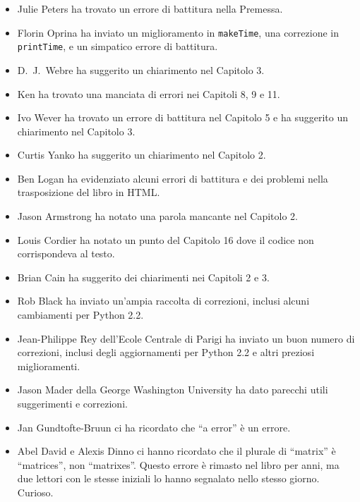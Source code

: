 \documentclass[10pt]{book}
\begin{document}
\begin{itemize}
\item Julie Peters ha trovato un errore di battitura nella Premessa.

\item Florin Oprina ha inviato un miglioramento in {\tt makeTime},
una correzione in {\tt printTime}, e un simpatico errore di battitura.

\item D.~J.~Webre ha suggerito un chiarimento nel Capitolo 3.

\item Ken ha trovato una manciata di errori nei Capitoli 8, 9 e 11.

\item Ivo Wever ha trovato un errore di battitura nel Capitolo 5 e ha suggerito un chiarimento nel Capitolo 3.

\item Curtis Yanko ha suggerito un chiarimento nel Capitolo 2.

\item Ben Logan ha evidenziato alcuni errori di battitura e dei problemi nella trasposizione del libro in HTML.

\item Jason Armstrong ha notato una parola mancante nel Capitolo 2.

\item Louis Cordier ha notato un punto del Capitolo 16 dove il codice non corrispondeva al testo.

\item Brian Cain ha suggerito dei chiarimenti nei Capitoli 2 e 3.

\item Rob Black ha inviato un'ampia raccolta di correzioni, inclusi alcuni cambiamenti per Python 2.2.

\item Jean-Philippe Rey dell'Ecole Centrale di Parigi ha inviato un buon numero di correzioni, inclusi degli aggiornamenti per Python 2.2 e altri preziosi miglioramenti.

\item Jason Mader della George Washington University ha dato parecchi utili suggerimenti e correzioni.

\item Jan Gundtofte-Bruun ci ha ricordato che ``a error'' è un errore.

\item Abel David e Alexis Dinno ci hanno ricordato che il plurale di
``matrix'' è ``matrices'', non ``matrixes''.  Questo errore è rimasto nel libro per anni, ma due lettori con le stesse iniziali lo hanno segnalato nello stesso giorno. Curioso.


\end{itemize}
\end{document}
